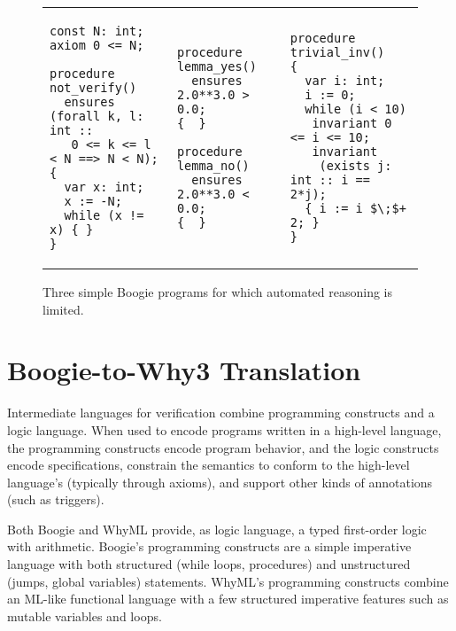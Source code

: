 \documentclass[a4paper,final]{llncs}
\newcommand{\Boogie}{Boogie\xspace}
\newcommand{\WhyML}{WhyML\xspace}
\begin{document}
\begin{figure}[!thb]
\centering
\scriptsize
\lstset{language=boogie}
\begin{tabular}{p{} p{} p{}}
{\begin{lstlisting}
const N: int;
axiom 0 <= N;

procedure not_verify()
  ensures (forall k, l: int :: 
   0 <= k <= l < N ==> N < N);
{
  var x: int;
  x := -N;
  while (x != x) { }
}\end{lstlisting}}
&
{\begin{lstlisting}
procedure lemma_yes()
  ensures 2.0**3.0 > 0.0;
{  }

procedure lemma_no()
  ensures 2.0**3.0 < 0.0;
{  }\end{lstlisting}}
&
{\begin{lstlisting}
procedure trivial_inv()
{
  var i: int;
  i := 0;
  while (i < 10)
   invariant 0 <= i <= 10;
   invariant 
    (exists j: int :: i == 2*j);
  { i := i $\;$+ 2; }
}\end{lstlisting}}
\end{tabular}
\caption{Three simple \Boogie programs for which automated reasoning is limited.}
\label{fig:motivating-examples}
\end{figure}
  




\section{Boogie-to-Why3 Translation}\label{sec:translation}

Intermediate languages for verification combine programming constructs and a logic language.
When used to encode programs written in a high-level language, the programming constructs encode program behavior, and the logic constructs encode specifications, constrain the semantics to conform to the high-level language's (typically through axioms), and support other kinds of annotations (such as triggers).

Both \Boogie and \WhyML provide, as logic language, a typed first-order logic with arithmetic.
\Boogie's programming constructs are a simple imperative language with both structured (while loops, procedures) and unstructured (jumps, global variables) statements.
\WhyML's programming constructs combine an ML-like functional language with a few structured imperative features such as mutable variables and loops.
\end{document}
